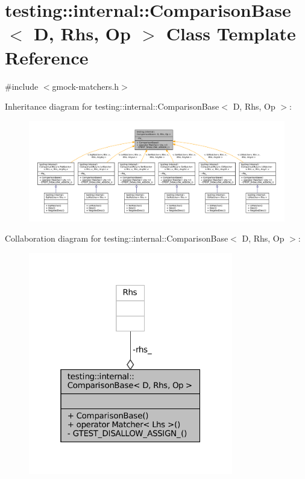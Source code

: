 \hypertarget{classtesting_1_1internal_1_1ComparisonBase}{}\section{testing\+:\+:internal\+:\+:Comparison\+Base$<$ D, Rhs, Op $>$ Class Template Reference}
\label{classtesting_1_1internal_1_1ComparisonBase}


{\ttfamily \#include $<$gmock-\/matchers.\+h$>$}



Inheritance diagram for testing\+:\+:internal\+:\+:Comparison\+Base$<$ D, Rhs, Op $>$\+:
\nopagebreak
\begin{figure}[H]
\begin{center}
\leavevmode
\includegraphics[width=350pt]{classtesting_1_1internal_1_1ComparisonBase__inherit__graph}
\end{center}
\end{figure}


Collaboration diagram for testing\+:\+:internal\+:\+:Comparison\+Base$<$ D, Rhs, Op $>$\+:
\nopagebreak
\begin{figure}[H]
\begin{center}
\leavevmode
\includegraphics[width=253pt]{classtesting_1_1internal_1_1ComparisonBase__coll__graph}
\end{center}
\end{figure}
